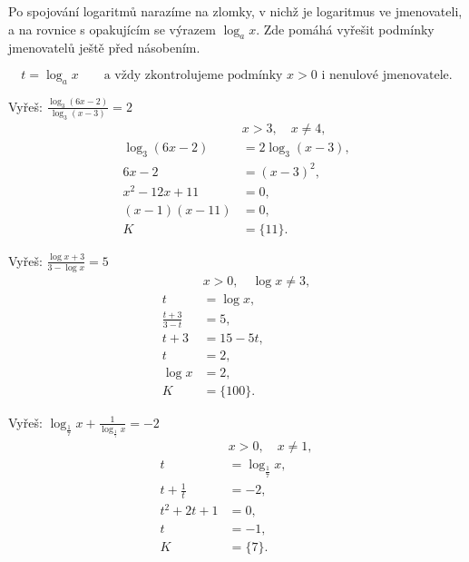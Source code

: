 \documentclass[11pt,a4paper]{article}
\begin{document}
Po spojování logaritmů narazíme na zlomky, v nichž je logaritmus ve jmenovateli, a na rovnice s opakujícím se výrazem $\log_a x$. Zde pomáhá vyřešit podmínky jmenovatelů ještě před násobením.

\[
t=\log_a x\qquad\text{a vždy zkontrolujeme podmínky }x>0\text{ i nenulové jmenovatele}.
\]


\begin{prikladReseniBox}[title={Příklad 1}]
Vyřeš: $\displaystyle \frac{\log_3(6x-2)}{\log_3(x-3)}=2$
\tcblower
\[
\begin{aligned}
&x>3,\quad x\ne4,\\
\log_3(6x-2)&=2\log_3(x-3),\\
6x-2&=(x-3)^2,\\
x^2-12x+11&=0,\\
(x-1)(x-11)&=0,\\
K&=\{11\}.
\end{aligned}
\]
\end{prikladReseniBox}
\begin{prikladReseniBox}[title={Příklad 2}]
Vyřeš: $\displaystyle \frac{\log x+3}{3-\log x}=5$
\tcblower
\[
\begin{aligned}
&x>0,\quad\log x\ne3,\\
t&=\log x,\\
\frac{t+3}{3-t}&=5,\\
t+3&=15-5t,\\
t&=2,\\
\log x&=2,\\
K&=\{100\}.
\end{aligned}
\]
\end{prikladReseniBox}
\begin{prikladReseniBox}[title={Příklad 3}]
Vyřeš: $\displaystyle \log_{\frac17}x+\frac{1}{\log_{\frac17}x}=-2$
\tcblower
\[
\begin{aligned}
&x>0,\quad x\ne1,\\
t&=\log_{\frac17}x,\\
t+\frac1t&=-2,\\
t^2+2t+1&=0,\\
t&=-1,\\
K&=\{7\}.
\end{aligned}
\]
\end{prikladReseniBox}
\end{document}
